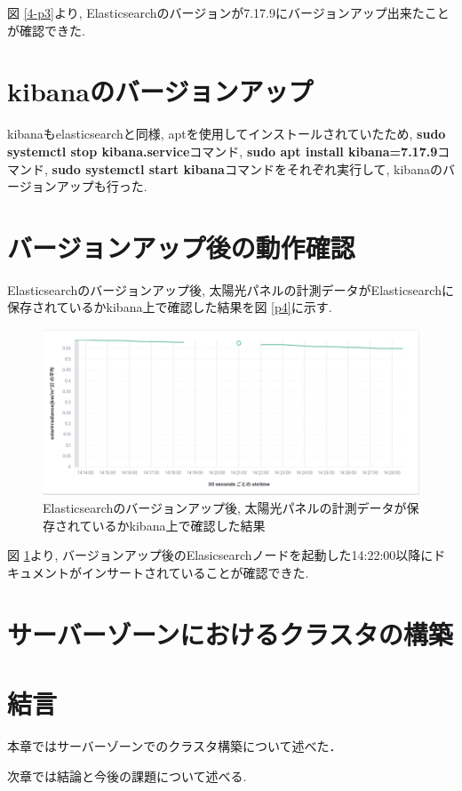 図 \ref{4-p3}より, Elasticsearchのバージョンが7.17.9にバージョンアップ出来たことが確認できた.

\section{kibanaのバージョンアップ}

kibanaもelasticsearchと同様, aptを使用してインストールされていたため, \textbf{sudo systemctl stop kibana.service}コマンド, \textbf{sudo apt install kibana=7.17.9}コマンド, \textbf{sudo systemctl start kibana}コマンドをそれぞれ実行して, kibanaのバージョンアップも行った.

\section{バージョンアップ後の動作確認}

Elasticsearchのバージョンアップ後, 太陽光パネルの計測データがElasticsearchに保存されているかkibana上で確認した結果を図 \ref{p4}に示す.

\begin{figure}
  \begin{center}
    \includegraphics[width=160mm]{sotu/figure/downtime.png}
    \caption{Elasticsearchのバージョンアップ後, 太陽光パネルの計測データが保存されているかkibana上で確認した結果}
    \label{4-p4}
  \end{center}
\end{figure}

図 \ref{4-p4}より, バージョンアップ後のElasicsearchノードを起動した14:22:00以降にドキュメントがインサートされていることが確認できた.

\section{サーバーゾーンにおけるクラスタの構築}

\section{結言}
本章ではサーバーゾーンでのクラスタ構築について述べた．

次章では結論と今後の課題について述べる.